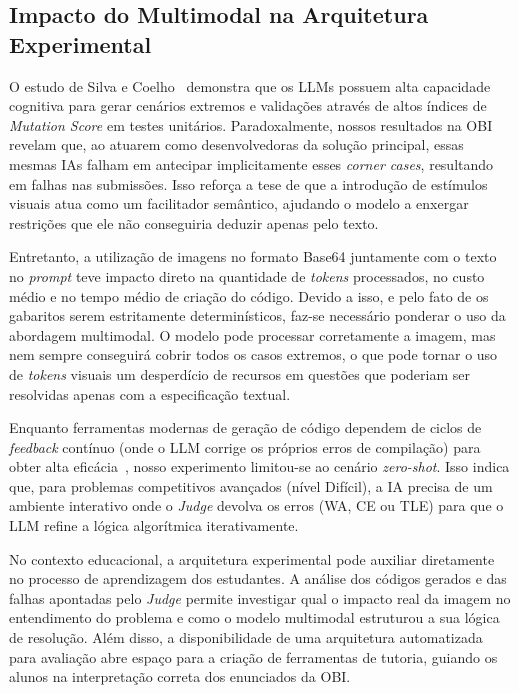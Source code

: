 \documentclass[sigconf,anonymous]{acmart} %
\begin{document}
\subsection{Impacto do Multimodal na Arquitetura Experimental}

O estudo de Silva e Coelho~\cite{Silva2025LLMs} demonstra que os LLMs possuem alta capacidade cognitiva para gerar cenários extremos e validações através de altos índices de \textit{Mutation Score} em testes unitários. Paradoxalmente, nossos resultados na OBI revelam que, ao atuarem como desenvolvedoras da solução principal, essas mesmas IAs falham em antecipar implicitamente esses \textit{corner cases}, resultando em falhas nas submissões. Isso reforça a tese de que a introdução de estímulos visuais atua como um facilitador semântico, ajudando o modelo a enxergar restrições que ele não conseguiria deduzir apenas pelo texto.

Entretanto, a utilização de imagens no formato Base64 juntamente com o texto no \textit{prompt} teve impacto direto na quantidade de \textit{tokens} processados, no custo médio e no tempo médio de criação do código. Devido a isso, e pelo fato de os gabaritos serem estritamente determinísticos, faz-se necessário ponderar o uso da abordagem multimodal. O modelo pode processar corretamente a imagem, mas nem sempre conseguirá cobrir todos os casos extremos, o que pode tornar o uso de \textit{tokens} visuais um desperdício de recursos em questões que poderiam ser resolvidas apenas com a especificação textual.

Enquanto ferramentas modernas de geração de código dependem de ciclos de \textit{feedback} contínuo (onde o LLM corrige os próprios erros de compilação) para obter alta eficácia~\cite{Silva2025LLMs}, nosso experimento limitou-se ao cenário \textit{zero-shot}. Isso indica que, para problemas competitivos avançados (nível Difícil), a IA precisa de um ambiente interativo onde o \textit{Judge} devolva os erros (WA, CE ou TLE) para que o LLM refine a lógica algorítmica iterativamente.

No contexto educacional, a arquitetura experimental pode auxiliar diretamente no processo de aprendizagem dos estudantes. A análise dos códigos gerados e das falhas apontadas pelo \textit{Judge} permite investigar qual o impacto real da imagem no entendimento do problema e como o modelo multimodal estruturou a sua lógica de resolução. Além disso, a disponibilidade de uma arquitetura automatizada para avaliação abre espaço para a criação de ferramentas de tutoria, guiando os alunos na interpretação correta dos enunciados da OBI.
\end{document}
